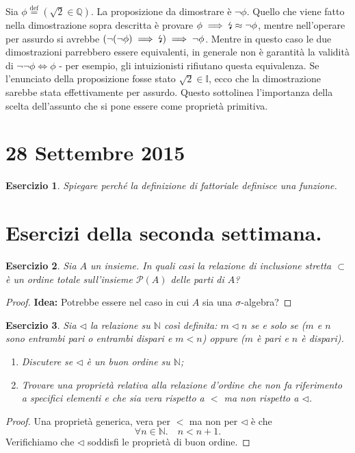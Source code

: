 \documentclass[fontsize = 11 pt, paper=A4, oneside, index=totoc, hyperref]{article}
\theoremstyle{definition}
\theoremstyle{plain}
\newtheorem{exe}{Esercizio}[section]
\newcommand{\N}{\mathbb{N}}
\newcommand{\assurdo}{\text{\lightning}}
\begin{document}
Sia \(\phi \overset{\text{def}}{=} \left(\sqrt{2} \in \mathbb{Q}\right)\). La proposizione da dimostrare è \(\lnot \phi\). Quello che viene fatto nella dimostrazione sopra descritta è provare \(\phi \implies \assurdo \approx \lnot \phi\), mentre nell'operare per assurdo si avrebbe \(\left(\lnot(\lnot \phi) \implies \assurdo\right) \implies \lnot \phi\). Mentre in questo caso le due dimostrazioni parrebbero essere equivalenti, in generale non è garantità la validità di \(\lnot\lnot\phi \iff \phi\)
- per esempio, gli intuizionisti rifiutano questa equivalenza. Se l'enunciato della proposizione fosse stato \(\sqrt{2} \in \mathbb{I}\), ecco che la dimostrazione sarebbe stata effettivamente per assurdo. Questo sottolinea l'importanza della scelta dell'assunto che si pone essere come proprietà primitiva.

\section{28 Settembre 2015}

\begin{exe}
  Spiegare perché la definizione di fattoriale definisce una funzione.
\end{exe}

\section{Esercizi della seconda settimana.}

\begin{exe}
  Sia \(A\) un insieme. In quali casi la relazione di inclusione stretta \(\subset\) è un ordine totale sull'insieme \(\mathcal{P}(A)\) delle parti di \(A\)?
\end{exe}
\begin{proof}
  {\bf Idea:} Potrebbe essere nel caso in cui \(A\) sia una \(\sigma\)-algebra?
\end{proof}

\begin{exe}
  \label{exe:1}
  Sia \(\lhd\) la relazione su \(\N\) così definita: \(m \lhd n\) se e solo se (\(m\) e \(n\) sono entrambi pari o entrambi dispari e \(m < n\)) oppure (\(m\) è pari e \(n\) è dispari).
  \begin{enumerate}
    \item Discutere se \(\lhd\) è un buon ordine su \(\N\);
    \item Trovare una proprietà relativa alla relazione d'ordine che non fa riferimento a specifici elementi e che sia vera rispetto a \(<\) ma non rispetto a \(\lhd\).
  \end{enumerate}
\end{exe}
\begin{proof}
  Una proprietà generica, vera per \(<\) ma non per \(\lhd\) è che
  \[
  \forall n \in \N.\quad n < n+1.
  \]
  Verifichiamo che \(\lhd\) soddisfi le proprietà di buon ordine. %
\end{proof}
\end{document}
